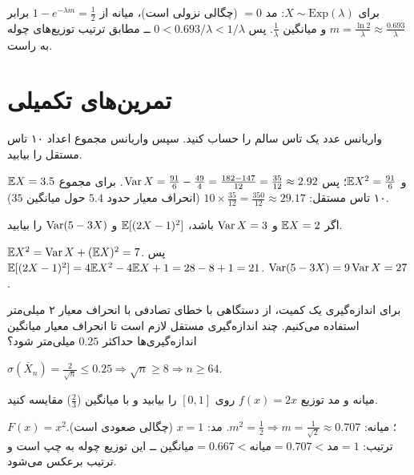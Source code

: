 \begin{example}
برای $X\sim\mathrm{Exp}(\lambda)$: مد $=0$ (چگالی نزولی است)، میانه از $1-e^{-\lambda m}=\frac12$ برابر $m=\frac{\ln2}{\lambda}\approx\frac{0.693}{\lambda}$ و میانگین $\frac1\lambda$. پس $0<0.693/\lambda<1/\lambda$ ــ مطابق ترتیب توزیع‌های چوله به راست.
\end{example}

\section{تمرین‌های تکمیلی}

\begin{exercise}
واریانس عدد یک تاس سالم را حساب کنید. سپس واریانس مجموع اعداد ۱۰ تاس مستقل را بیابید.
\end{exercise}
\begin{solution}
$\mathbb{E} X=3.5$ و $\mathbb{E} X^2=\frac{91}{6}$؛ پس $\operatorname{Var} X=\frac{91}{6}-\frac{49}{4}=\frac{182-147}{12}=\frac{35}{12}\approx2.92$. برای مجموع ۱۰ تاس مستقل: $10\times\frac{35}{12}=\frac{350}{12}\approx29.17$ (انحراف معیار حدود $5.4$ حول میانگین $35$).
\end{solution}

\begin{exercise}
اگر $\mathbb{E} X=2$ و $\operatorname{Var} X=3$ باشد، $\mathbb{E}[(2X-1)^2]$ و $\operatorname{Var}(5-3X)$ را بیابید.
\end{exercise}
\begin{solution}
$\mathbb{E} X^2=\operatorname{Var} X+(\mathbb{E} X)^2=7$. پس $\mathbb{E}[(2X-1)^2]=4\mathbb{E} X^2-4\mathbb{E} X+1=28-8+1=21$.
$\operatorname{Var}(5-3X)=9\operatorname{Var} X=27$.
\end{solution}

\begin{exercise}
برای اندازه‌گیری یک کمیت، از دستگاهی با خطای تصادفی با انحراف معیار ۲ میلی‌متر استفاده می‌کنیم. چند اندازه‌گیری مستقل لازم است تا انحراف معیار میانگین اندازه‌گیری‌ها حداکثر $0.25$ میلی‌متر شود؟
\end{exercise}
\begin{solution}
$\sigma(\bar X_n)=\frac{2}{\sqrt n}\le0.25\Rightarrow\sqrt n\ge8\Rightarrow n\ge64$.
\end{solution}

\begin{exercise}
میانه و مد توزیع $f(x)=2x$ روی $[0,1]$ را بیابید و با میانگین ($\frac23$) مقایسه کنید.
\end{exercise}
\begin{solution}
$F(x)=x^2$؛ میانه: $m^2=\frac12\Rightarrow m=\frac1{\sqrt2}\approx0.707$. مد: $x=1$ (چگالی صعودی است). ترتیب: $\text{میانگین}=0.667<\text{میانه}=0.707<\text{مد}=1$ ــ این توزیع چوله به چپ است و ترتیب برعکس می‌شود.
\end{solution}
